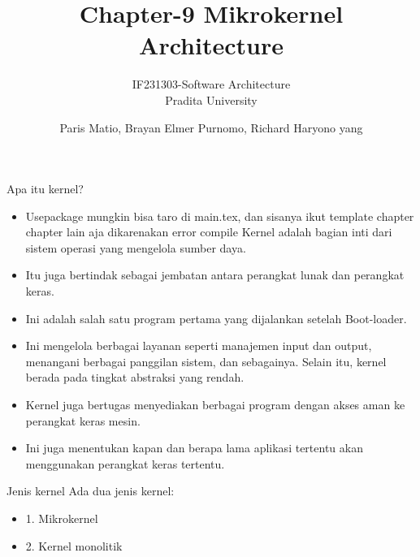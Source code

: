\documentclass{beamer}
\title{Chapter-9 Mikrokernel Architecture}
\subtitle{IF231303-Software Architecture\\Pradita University}
\author{Paris Matio, Brayan Elmer Purnomo, Richard Haryono yang}
\begin{document}
		\begin{frame}[plain]
			\maketitle
		\end{frame}
	\begin{frame}{Apa itu kernel?}
		\begin{itemize}
			\item Usepackage mungkin bisa taro di main.tex, dan sisanya ikut template chapter chapter lain aja dikarenakan error compile
			Kernel adalah bagian inti dari sistem operasi yang mengelola sumber daya. 

	
	\item Itu juga bertindak sebagai jembatan antara perangkat lunak dan perangkat keras. 
	
	\item Ini adalah salah satu program pertama yang dijalankan setelah Boot-loader.
	
	\item Ini mengelola berbagai layanan seperti manajemen input dan output, menangani berbagai panggilan sistem, dan sebagainya. Selain itu, kernel berada pada tingkat abstraksi yang rendah.
	
	\item Kernel juga bertugas menyediakan berbagai program dengan akses aman ke perangkat keras mesin. 
	
	\item Ini juga menentukan kapan dan berapa lama aplikasi tertentu akan menggunakan perangkat keras tertentu.
			\end{itemize}
	\end{frame}	

	\begin{frame}{Jenis kernel}
		Ada dua jenis kernel:
	\begin{itemize}
		\item 	1. Mikrokernel
		\item	2. Kernel monolitik
	\end{itemize}

	\end{frame}

	
	
\end{document}
